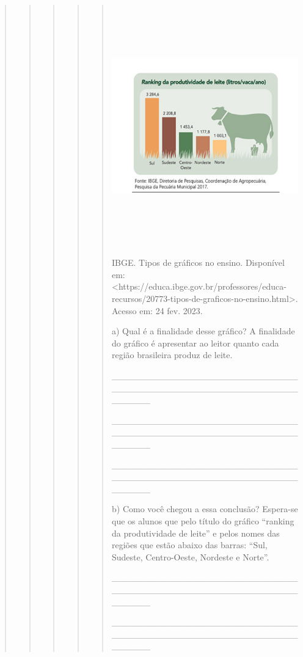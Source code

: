 \begin{quote}
\begin{quote}
\begin{quote}
\begin{quote}
\begin{quote}
\includegraphics[width=5.68530in,height=4.10069in]{media/image29.png}

IBGE. Tipos de gráficos no ensino. Disponível em:
\textless{}https://educa.ibge.gov.br/professores/educa-recursos/20773-tipos-de-graficos-no-ensino.html\textgreater{}.
Acesso em: 24 fev. 2023.

a) Qual é a finalidade desse gráfico? A finalidade do gráfico é
apresentar ao leitor quanto cada região brasileira produz de leite.

\_\_\_\_\_\_\_\_\_\_\_\_\_\_\_\_\_\_\_\_\_\_\_\_\_\_\_\_\_\_\_\_\_\_\_\_\_\_\_\_\_\_\_\_\_\_\_\_\_\_\_\_\_\_\_\_\_\_\_\_\_\_\_\_

\_\_\_\_\_\_\_\_\_\_\_\_\_\_\_\_\_\_\_\_\_\_\_\_\_\_\_\_\_\_\_\_\_\_\_\_\_\_\_\_\_\_\_\_\_\_\_\_\_\_\_\_\_\_\_\_\_\_\_\_\_\_\_\_

\_\_\_\_\_\_\_\_\_\_\_\_\_\_\_\_\_\_\_\_\_\_\_\_\_\_\_\_\_\_\_\_\_\_\_\_\_\_\_\_\_\_\_\_\_\_\_\_\_\_\_\_\_\_\_\_\_\_\_\_\_\_\_\_

b) Como você chegou a essa conclusão? Espera-se que os alunos que pelo
título do gráfico ``ranking da produtividade de leite'' e pelos nomes
das regiões que estão abaixo das barras: ``Sul, Sudeste, Centro-Oeste,
Nordeste e Norte''.

\_\_\_\_\_\_\_\_\_\_\_\_\_\_\_\_\_\_\_\_\_\_\_\_\_\_\_\_\_\_\_\_\_\_\_\_\_\_\_\_\_\_\_\_\_\_\_\_\_\_\_\_\_\_\_\_\_\_\_\_\_\_\_\_

\_\_\_\_\_\_\_\_\_\_\_\_\_\_\_\_\_\_\_\_\_\_\_\_\_\_\_\_\_\_\_\_\_\_\_\_\_\_\_\_\_\_\_\_\_\_\_\_\_\_\_\_\_\_\_\_\_\_\_\_\_\_\_\_


\end{quote}
\end{quote}
\end{quote}
\end{quote}
\end{quote}
